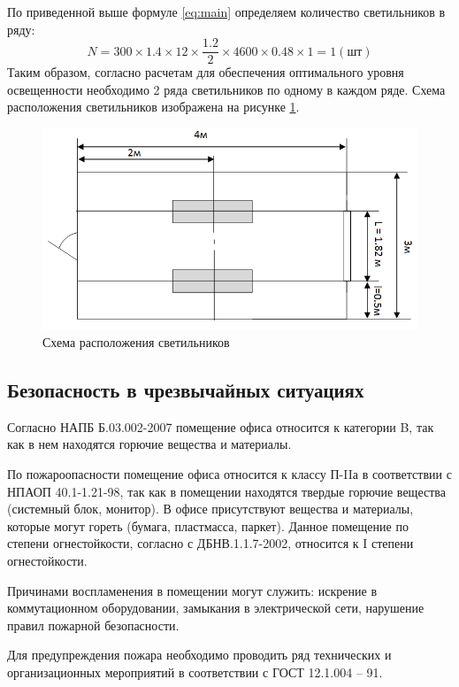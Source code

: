 По приведенной выше формуле \eqref{eq:main} определяем количество светильников в ряду:
\[
    N = 300 \times 1.4 \times 12 \times {\dfrac{1.2}{2}} \times 4600 \times 0.48 \times 1 = 1 (\text{шт})
\]
Таким образом, согласно расчетам для обеспечения оптимального уровня освещенности необходимо 2 ряда светильников по
одному в каждом ряде. Схема расположения светильников изображена на рисунке \ref{fig:torch}.

\begin{figure}[!ht]
    \centering
    \includegraphics[scale=0.4]{graphics/torch.png}
    \caption{Схема расположения светильников}
    \label{fig:torch}
\end{figure}

\subsection{Безопасность в чрезвычайных ситуациях}

Согласно НАПБ Б.03.002-2007 помещение офиса относится к категории B,
так как в нем находятся горючие вещества и материалы. 

По пожароопасности помещение офиса относится к классу П-IIа в соответствии с НПАОП 40.1-1.21-98, 
так как в помещении находятся твердые горючие вещества (системный блок, монитор). В офисе присутствуют 
вещества и материалы, которые могут гореть (бумага, пластмасса, паркет). Данное помещение по степени огнестойкости,
согласно с ДБНВ.1.1.7-2002, относится к I степени огнестойкости. 

Причинами воспламенения в помещении могут служить: искрение в коммутационном оборудовании, 
замыкания в электрической сети, нарушение правил пожарной безопасности. 

Для предупреждения пожара необходимо проводить ряд технических и организационных мероприятий в соответствии 
с ГОСТ 12.1.004 – 91.

